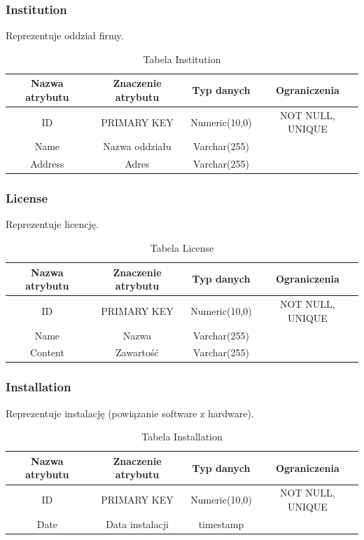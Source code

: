 \subsubsection{Institution}
Reprezentuje oddział firmy.
\begin{table}[H]
	\renewcommand\arraystretch{1.5}
	\renewcommand\tabcolsep{3pt}
	\begin{tabular}{| c | c | c | c |} 
		\hline \textbf{Nazwa atrybutu} & \textbf{Znaczenie atrybutu} & \textbf{Typ danych} & \textbf{Ograniczenia} \\ 
		\hline ID & PRIMARY KEY & Numeric(10,0) & NOT NULL, UNIQUE \\ 
		\hline Name & Nazwa oddziału & Varchar(255) &  \\ 
		\hline Address & Adres & Varchar(255) & \\ 
		\hline 
	\end{tabular} 
	\caption{Tabela Institution}
	\label{TAB:Institution}
\end{table}

\subsubsection{License}
Reprezentuje licencję.
\begin{table}[H]
	\renewcommand\arraystretch{1.5}
	\renewcommand\tabcolsep{3pt}
	\begin{tabular}{| c | c | c | c |} 
		\hline \textbf{Nazwa atrybutu} & \textbf{Znaczenie atrybutu} & \textbf{Typ danych} & \textbf{Ograniczenia} \\ 
		\hline ID & PRIMARY KEY & Numeric(10,0) & NOT NULL, UNIQUE \\ 
		\hline Name & Nazwa & Varchar(255) &  \\ 
		\hline Content & Zawartość & Varchar(255) & \\ 
		\hline 
	\end{tabular} 
	\caption{Tabela License}
	\label{TAB:License}
\end{table}

\subsubsection{Installation}
Reprezentuje instalację (powiązanie software z hardware).
\begin{table}[H]
	\renewcommand\arraystretch{1.5}
	\renewcommand\tabcolsep{3pt}
	\begin{tabular}{| c | c | c | c |} 
		\hline \textbf{Nazwa atrybutu} & \textbf{Znaczenie atrybutu} & \textbf{Typ danych} & \textbf{Ograniczenia} \\ 
		\hline ID & PRIMARY KEY & Numeric(10,0) & NOT NULL, UNIQUE \\ 
		\hline Date & Data instalacji & timestamp &  \\ 
		\hline 
	\end{tabular} 
	\caption{Tabela Installation}
	\label{TAB:Installation}
\end{table}


